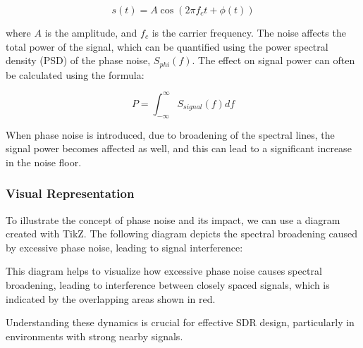 \[
s(t) = A \cos(2 \pi f_c t + \phi(t))
\]

where \( A \) is the amplitude, and \( f_c \) is the carrier frequency. The noise affects the total power of the signal, which can be quantified using the power spectral density (PSD) of the phase noise, \( S_{phi}(f) \). The effect on signal power can often be calculated using the formula:

\[
P = \int_{-\infty}^{\infty} S_{signal}(f) df 
\]

When phase noise is introduced, due to broadening of the spectral lines, the signal power becomes affected as well, and this can lead to a significant increase in the noise floor.

\subsubsection{Visual Representation}

To illustrate the concept of phase noise and its impact, we can use a diagram created with TikZ. The following diagram depicts the spectral broadening caused by excessive phase noise, leading to signal interference:


This diagram helps to visualize how excessive phase noise causes spectral broadening, leading to interference between closely spaced signals, which is indicated by the overlapping areas shown in red. 

Understanding these dynamics is crucial for effective SDR design, particularly in environments with strong nearby signals.
